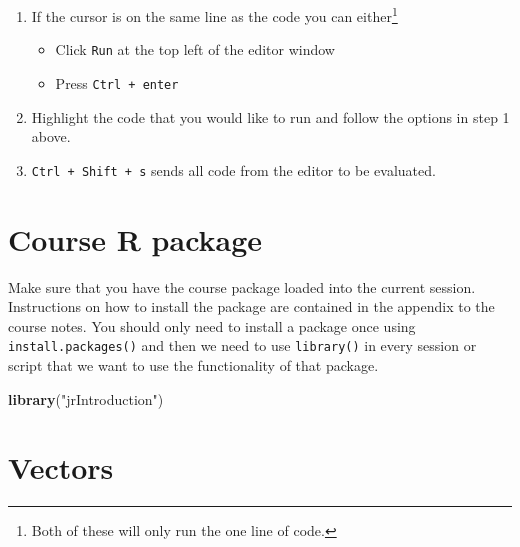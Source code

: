 \documentclass[]{tufte-handout}
\newenvironment{Shaded}{}{}
\newcommand{\KeywordTok}[1]{\textcolor[rgb]{0.00,0.44,0.13}{\textbf{#1}}}
\newcommand{\NormalTok}[1]{#1}
\newcommand{\StringTok}[1]{\textcolor[rgb]{0.25,0.44,0.63}{#1}}
\providecommand{\tightlist}{%
  \setlength{\itemsep}{0pt}\setlength{\parskip}{0pt}}
\begin{document}
\begin{enumerate}
\def\labelenumi{\arabic{enumi}.}
\tightlist
\item
  If the cursor is on the same line as the code you can either\footnote{Both
    of these will only run the one line of code.}

  \begin{itemize}
  \tightlist
  \item
    Click \texttt{Run} at the top left of the editor window
  \item
    Press \texttt{Ctrl\ +\ enter}
  \end{itemize}
\item
  Highlight the code that you would like to run and follow the options
  in step 1 above.
\item
  \texttt{Ctrl\ +\ Shift\ +\ s} sends all code from the editor to be
  evaluated.
\end{enumerate}


\hypertarget{course-r-package}{%
\section{Course R package}\label{course-r-package}}

Make sure that you have the course package loaded into the current
session. Instructions on how to install the package are contained in the
appendix to the course notes. You should only need to install a package
once using \texttt{install.packages()} and then we need to use
\texttt{library()} in every session or script that we want to use the
functionality of that package.

\begin{Shaded}
\begin{Highlighting}[]
\KeywordTok{library}\NormalTok{(}\StringTok{"jrIntroduction"}\NormalTok{)}
\end{Highlighting}
\end{Shaded}

\hypertarget{vectors}{%
\section{Vectors}\label{vectors}}
\end{document}
